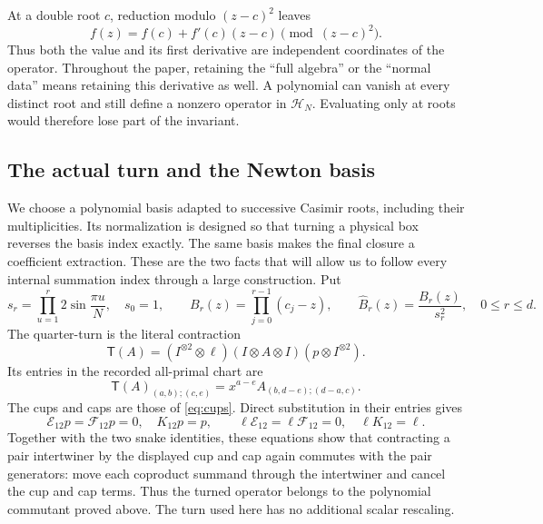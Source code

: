 \documentclass[11pt]{article}
\numberwithin{equation}{section}
\theoremstyle{definition}\newtheorem{definition}[theorem]{Definition}
\theoremstyle{remark}\newtheorem{remark}[theorem]{Remark}
\newcommand{\cH}{\mathcal H}\newcommand{\Bhat}{\widehat B}
\newcommand{\Turn}{\mathsf T}\newcommand{\Cheb}{\mathsf C}
\begin{document}
At a double root $c$, reduction modulo $(z-c)^2$ leaves
\[
 f(z)=f(c)+f'(c)(z-c)\pmod{(z-c)^2}.
\]
Thus both the value and its first derivative are independent coordinates of the operator. Throughout the paper, retaining the ``full algebra'' or the ``normal data'' means retaining this derivative as well. A polynomial can vanish at every distinct root and still define a nonzero operator in $\cH_N$. Evaluating only at roots would therefore lose part of the invariant.

\subsection{The actual turn and the Newton basis}

We choose a polynomial basis adapted to successive Casimir roots, including their multiplicities. Its normalization is designed so that turning a physical box reverses the basis index exactly. The same basis makes the final closure a coefficient extraction. These are the two facts that will allow us to follow every internal summation index through a large construction.
Put
\begin{equation}\label{eq:newton-basis}
 s_r=\prod_{u=1}^{r}2\sin\frac{\pi u}{N},\quad s_0=1,\qquad
 B_r(z)=\prod_{j=0}^{r-1}(c_j-z),\qquad
 \Bhat_r(z)=\frac{B_r(z)}{s_r^2},\quad 0\le r\le d.
\end{equation}
The quarter-turn is the literal contraction
\[
 \Turn(A)=(I^{\otimes2}\otimes\ell)(I\otimes A\otimes I)
 (p\otimes I^{\otimes2}).
\]
Its entries in the recorded all-primal chart are
\[
 \Turn(A)_{(a,b);(c,e)}=x^{a-e}A_{(b,d-e);(d-a,c)}.
\]
The cups and caps are those of \eqref{eq:cups}. Direct substitution
in their entries gives
\[
 \mathcal E_{12}p=\mathcal F_{12}p=0,\quad K_{12}p=p,
 \qquad
 \ell\mathcal E_{12}=\ell\mathcal F_{12}=0,\quad \ell K_{12}=\ell.
\]
Together with the two snake identities, these equations show that
contracting a pair intertwiner by the displayed cup and cap again
commutes with the pair generators: move each coproduct summand through
the intertwiner and cancel the cup and cap terms. Thus the turned
operator belongs to the polynomial commutant proved above. The turn
used here has no additional scalar rescaling.
\end{document}
